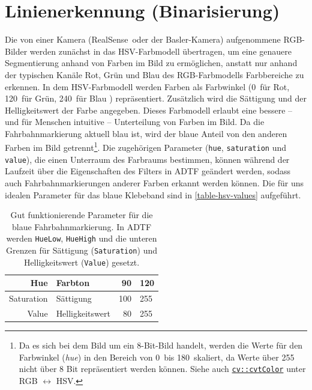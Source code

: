 \documentclass[a4paper,12pt]{report}
\begin{document}
\pagebreak

\section{Linienerkennung (Binarisierung)}
	Die von einer Kamera (RealSense\texttrademark\ oder der Basler-Kamera) aufgenommene RGB-Bilder werden zunächst in das HSV-Farbmodell übertragen, um eine genauere Segmentierung anhand von Farben im Bild zu ermöglichen, anstatt nur anhand der typischen Kanäle Rot, Grün und Blau des RGB-Farbmodells Farbbereiche zu erkennen.
	In dem HSV-Farbmodell werden Farben als Farbwinkel (0\degree\ für Rot, 120\degree\ für Grün, 240\degree\ für Blau \cite{HSV-Wiki}) repräsentiert. Zusätzlich wird die Sättigung und der Helligkeitswert der Farbe angegeben.
	Dieses Farbmodell erlaubt eine bessere -- und für Menschen intuitive -- Unterteilung von Farben im Bild.
	Da die Fahrbahnmarkierung aktuell blau ist, wird der blaue Anteil von den anderen Farben im Bild getrennt\footnote{Da es sich bei dem Bild um ein 8-Bit-Bild handelt, werden die Werte für den Farbwinkel (\textit{hue}) in den Bereich von 0\degree\ bis 180\degree\ skaliert, da Werte über 255 nicht über 8 Bit repräsentiert werden können.
	Siehe auch \href{https://docs.opencv.org/2.4/modules/imgproc/doc/miscellaneous_transformations.html\#cvtcolor}{\texttt{cv::cvtColor}} \cite{opencv-doc} unter RGB $\longleftrightarrow$ HSV.}.
	Die zugehörigen Parameter (\texttt{hue}, \texttt{saturation} und \texttt{value}), die einen Unterraum des Farbraums bestimmen, können während der Laufzeit über die Eigenschaften des Filters in ADTF geändert werden, sodass auch Fahrbahnmarkierungen anderer Farben erkannt werden können.
	Die für uns idealen Parameter für das blaue Klebeband sind in \autoref{table-hsv-values} aufgeführt.

	\begin{table}
		\centering
		\begin{tabular}{r@{\,/\,}l|r@{$-$}l}
			Hue & Farbton & 90 & 120\\\hline
			Saturation & Sättigung & 100 & 255\\\hline
			Value & Helligkeitswert & 80 & 255
		\end{tabular}
		\caption{Gut funktionierende Parameter für die blaue Fahrbahnmarkierung. In ADTF werden \texttt{HueLow}, \texttt{HueHigh} und die unteren Grenzen für Sättigung (\texttt{Saturation}) und Helligkeitswert (\texttt{Value}) gesetzt.}
		\label{table-hsv-values}
	\end{table}
\end{document}
